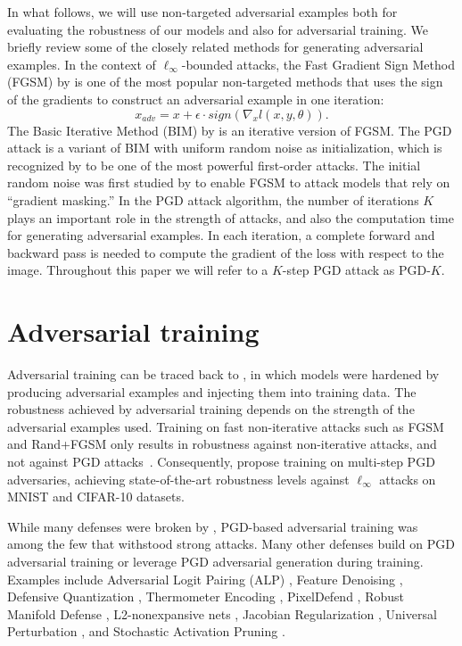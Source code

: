 \documentclass{article}
\begin{document}
In what follows, we will use non-targeted adversarial examples both for evaluating the robustness of our models and also for adversarial training. We briefly review some of the closely related methods for generating adversarial examples. In the context of $\ell_{\infty}$-bounded attacks, the Fast Gradient Sign Method (FGSM) by \cite{goodfellow2014explaining} is one of the most popular non-targeted methods that uses the sign of the gradients to construct an adversarial example in one iteration:
\begin{equation}
    x_{adv} = x + \epsilon \cdot sign(\nabla_x l (x,y,\theta)).
    \label{eq:FGSM_update}
\end{equation}
The Basic Iterative Method (BIM) by \cite{kurakin2016adversarialBIM} is an iterative version of FGSM. 
The PGD attack is a variant of BIM with uniform random noise as initialization, which is recognized by \cite{athalye2018obfuscated} to be one of the most powerful first-order attacks.
The initial random noise was first studied by \cite{tramer2017ensemble} to enable FGSM to attack models that rely on ``gradient masking.'' 
In the PGD attack algorithm,
the number of iterations $K$ plays an important role in the strength of attacks, and also the computation time for generating adversarial examples. 
In each iteration, a complete forward and backward pass is needed to compute the gradient of the loss with respect to the image.
Throughout this paper we will refer to a $K$-step PGD attack as PGD-$K$.



\section{Adversarial training}
Adversarial training can be traced back to \citep{goodfellow2014explaining}, in which models were hardened by producing adversarial examples and injecting them into training data. 
The robustness achieved by adversarial training depends on the strength of the adversarial examples used. 
Training on fast non-iterative attacks such as FGSM and Rand+FGSM only results in robustness against non-iterative attacks, and not against PGD attacks~\citep{kurakin2016adversarial,madry2017towards}. Consequently, \cite{madry2017towards} propose training on multi-step PGD adversaries, achieving state-of-the-art robustness levels against $\ell_\infty$ attacks on MNIST and CIFAR-10 datasets. 

While many defenses were broken by \cite{athalye2018obfuscated}, PGD-based adversarial training was among the few that withstood strong attacks. Many other defenses build on PGD adversarial training or leverage PGD adversarial generation during training. Examples include Adversarial Logit Pairing (ALP) \citep{kannan2018adversarial}, Feature Denoising \citep{xie2018feature}, Defensive Quantization \citep{lin2018defensive}, Thermometer Encoding \citep{buckman2018thermometer}, PixelDefend \citep{song2017pixeldefend}, Robust Manifold Defense \citep{ilyas2017robust}, L2-nonexpansive nets \citep{qian2018l2}, Jacobian Regularization \citep{jakubovitz2018improving},
Universal Perturbation \citep{shafahi2018universal}, 
and Stochastic Activation Pruning \citep{dhillon2018stochastic}. 
\end{document}
